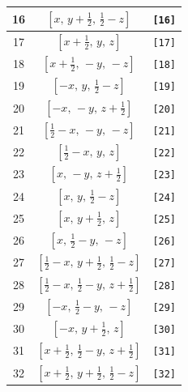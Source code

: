 \documentclass[fleqn,8pt]{jsarticle}
\begin{document}
\begin{longtable}{ccc}
16 & $\left[ x,\, y + \frac{1}{2},\, \frac{1}{2} - z \right]$ & {\tt [16]} \\ \hline
17 & $\left[ x + \frac{1}{2},\, y,\, z \right]$ & {\tt [17]} \\ \hline
18 & $\left[ x + \frac{1}{2},\, - y,\, - z \right]$ & {\tt [18]} \\ \hline
19 & $\left[ - x,\, y,\, \frac{1}{2} - z \right]$ & {\tt [19]} \\ \hline
20 & $\left[ - x,\, - y,\, z + \frac{1}{2} \right]$ & {\tt [20]} \\ \hline
21 & $\left[ \frac{1}{2} - x,\, - y,\, - z \right]$ & {\tt [21]} \\ \hline
22 & $\left[ \frac{1}{2} - x,\, y,\, z \right]$ & {\tt [22]} \\ \hline
23 & $\left[ x,\, - y,\, z + \frac{1}{2} \right]$ & {\tt [23]} \\ \hline
24 & $\left[ x,\, y,\, \frac{1}{2} - z \right]$ & {\tt [24]} \\ \hline
25 & $\left[ x,\, y + \frac{1}{2},\, z \right]$ & {\tt [25]} \\ \hline
26 & $\left[ x,\, \frac{1}{2} - y,\, - z \right]$ & {\tt [26]} \\ \hline
27 & $\left[ \frac{1}{2} - x,\, y + \frac{1}{2},\, \frac{1}{2} - z \right]$ & {\tt [27]} \\ \hline
28 & $\left[ \frac{1}{2} - x,\, \frac{1}{2} - y,\, z + \frac{1}{2} \right]$ & {\tt [28]} \\ \hline
29 & $\left[ - x,\, \frac{1}{2} - y,\, - z \right]$ & {\tt [29]} \\ \hline
30 & $\left[ - x,\, y + \frac{1}{2},\, z \right]$ & {\tt [30]} \\ \hline
31 & $\left[ x + \frac{1}{2},\, \frac{1}{2} - y,\, z + \frac{1}{2} \right]$ & {\tt [31]} \\ \hline
32 & $\left[ x + \frac{1}{2},\, y + \frac{1}{2},\, \frac{1}{2} - z \right]$ & {\tt [32]} \\
\end{longtable}
\end{document}
